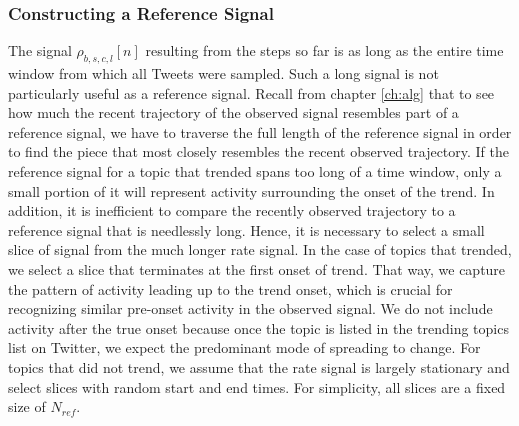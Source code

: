 \subsubsection{Constructing a Reference Signal}
The signal $\rho_{b,s,c,l}[n]$ resulting from the steps so far is as long as the
entire time window from which all Tweets were sampled. Such a long signal is not
particularly useful as a reference signal. Recall from chapter \ref{ch:alg} that
to see how much the recent trajectory of the observed signal resembles part of a
reference signal, we have to traverse the full length of the reference signal in
order to find the piece that most closely resembles the recent observed
trajectory. If the reference signal for a topic that trended spans too long of a
time window, only a small portion of it will represent activity surrounding the
onset of the trend. In addition, it is inefficient to compare the recently
observed trajectory to a reference signal that is needlessly long. Hence, it is
necessary to select a small slice of signal from the much longer rate signal. In
the case of topics that trended, we select a slice that terminates at the first
onset of trend. That way, we capture the pattern of activity leading up to the
trend onset, which is crucial for recognizing similar pre-onset activity in the
observed signal. We do not include activity after the true onset because once
the topic is listed in the trending topics list on Twitter, we expect the
predominant mode of spreading to change. For topics that did not trend, we
assume that the rate signal is largely stationary and select slices with random
start and end times. For simplicity, all slices are a fixed size of $N_{ref}$.

